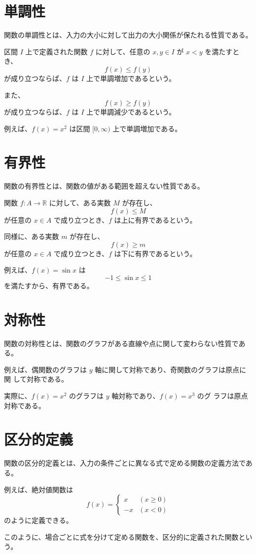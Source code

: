 \documentclass[11pt]{ltjsreport}
\begin{document}
\section{単調性}

関数の単調性とは、入力の大小に対して出力の大小関係が保たれる性質である。

区間 \( I \) 上で定義された関数 \( f \) に対して、任意の \( x, y \in I \) が
\( x < y \) を満たすとき、
\[
   f(x) \le f(y)
\]
が成り立つならば、\( f \) は \( I \) 上で単調増加であるという。

また、
\[
   f(x) \ge f(y)
\]
が成り立つならば、\( f \) は \( I \) 上で単調減少であるという。

例えば、\( f(x) = x^2 \) は区間 \( [0, \infty) \) 上で単調増加である。

\section{有界性}

関数の有界性とは、関数の値がある範囲を超えない性質である。

関数 \( f : A \to \mathbb{R} \) に対して、ある実数 \( M \) が存在し、
\[
   f(x) \le M
\]
が任意の \( x \in A \) で成り立つとき、\( f \) は上に有界であるという。

同様に、ある実数 \( m \) が存在し、
\[
   f(x) \ge m
\]
が任意の \( x \in A \) で成り立つとき、\( f \) は下に有界であるという。

例えば、\( f(x) = \sin x \) は
\[
   -1 \le \sin x \le 1
\]
を満たすから、有界である。

\section{対称性}

関数の対称性とは、関数のグラフがある直線や点に関して変わらない性質である。

例えば、偶関数のグラフは \( y \) 軸に関して対称であり、奇関数のグラフは原点に関
して対称である。

実際に、\( f(x) = x^2 \) のグラフは \( y \) 軸対称であり、\( f(x) = x^3 \) のグ
ラフは原点対称である。

\section{区分的定義}

関数の区分的定義とは、入力の条件ごとに異なる式で定める関数の定義方法である。

例えば、絶対値関数は
\[
   f(x) =
   \begin{cases}
      x  & (x \ge 0) \\
      -x & (x < 0)
   \end{cases}
\]
のように定義できる。

このように、場合ごとに式を分けて定める関数を、区分的に定義された関数という。
\end{document}
